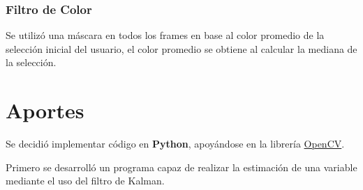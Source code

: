 \subsubsection{Filtro de Color}
Se utilizó una máscara en todos los frames en base al color promedio de la selección inicial del usuario, el color promedio se obtiene al calcular la mediana de la selección.
 
\section{Aportes}

Se decidió implementar código en \textbf{Python}, apoyándose en la librería \href{https://opencv.org/}{OpenCV}.

Primero se desarrolló un programa capaz de realizar la estimación de una variable mediante el uso del filtro de Kalman.


